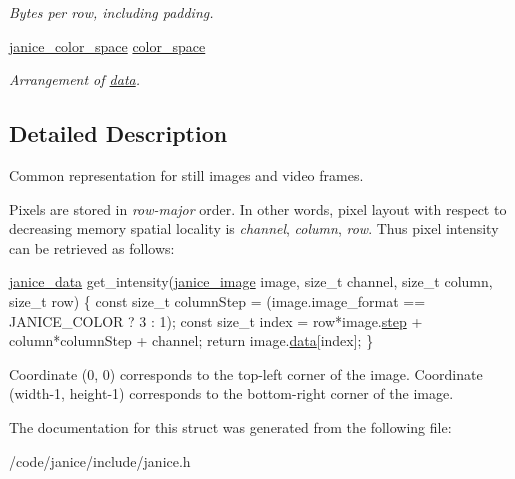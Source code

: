 \begin{DoxyCompactItemize}
\begin{DoxyCompactList}\small\item\em Bytes per row, including padding. \end{DoxyCompactList}\item 
\hypertarget{structjanice__image_a063fab12b1320e684138c3a3880f3f26}{}\hyperlink{group__janice_ga4040c8aa81857fc2102f27cf34cd973e}{janice\+\_\+color\+\_\+space} \hyperlink{structjanice__image_a063fab12b1320e684138c3a3880f3f26}{color\+\_\+space}\label{structjanice__image_a063fab12b1320e684138c3a3880f3f26}

\begin{DoxyCompactList}\small\item\em Arrangement of \hyperlink{structjanice__image_a2805270d1ff18acf887f22207af4685b}{data}. \end{DoxyCompactList}\end{DoxyCompactItemize}


\subsection{Detailed Description}
Common representation for still images and video frames. 

Pixels are stored in {\itshape row-\/major} order. In other words, pixel layout with respect to decreasing memory spatial locality is {\itshape channel}, {\itshape column}, {\itshape row}. Thus pixel intensity can be retrieved as follows\+:


\begin{DoxyCode}
\hyperlink{group__janice_ga63103e7e1c9df7d7403640223f3f6f07}{janice\_data} get\_intensity(\hyperlink{structjanice__image}{janice\_image} image, \textcolor{keywordtype}{size\_t} channel, \textcolor{keywordtype}{size\_t} column,
                                                                     \textcolor{keywordtype}{size\_t} row)
\{
    \textcolor{keyword}{const} \textcolor{keywordtype}{size\_t} columnStep = (image.image\_format == JANICE\_COLOR ? 3 : 1);
    \textcolor{keyword}{const} \textcolor{keywordtype}{size\_t} index = row*image.\hyperlink{structjanice__image_aa4e245b8861d67dda7a46b3aa7d66df4}{step} + column*columnStep + channel;
    \textcolor{keywordflow}{return} image.\hyperlink{structjanice__image_a2805270d1ff18acf887f22207af4685b}{data}[index];
\}
\end{DoxyCode}


Coordinate (0, 0) corresponds to the top-\/left corner of the image. Coordinate (width-\/1, height-\/1) corresponds to the bottom-\/right corner of the image. 

The documentation for this struct was generated from the following file\+:\begin{DoxyCompactItemize}
\item 
/code/janice/include/janice.\+h\end{DoxyCompactItemize}
